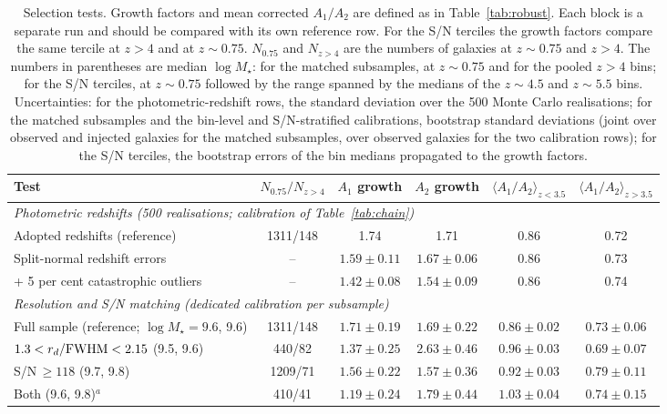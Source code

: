 \documentclass[fleqn,usenatbib]{mnras}
\newcommand{\Mstar}{M_\star}
\begin{document}
\begin{table}
\centering
\caption{Selection tests. Growth factors and mean corrected $A_1/A_2$ are
defined as in Table~\ref{tab:robust}. Each block is a separate run and should be
compared with its own reference row. For the S/N terciles the growth factors
compare the same tercile at $z>4$ and at $z\sim0.75$. $N_{0.75}$ and $N_{z>4}$ are
the numbers of galaxies at $z\sim0.75$ and $z>4$. The numbers in parentheses are
median $\log\Mstar$: for the matched subsamples, at $z\sim0.75$ and for the pooled
$z>4$ bins; for the S/N terciles, at $z\sim0.75$ followed by the range spanned by
the medians of the $z\sim4.5$ and $z\sim5.5$ bins. Uncertainties: for the
photometric-redshift rows, the standard deviation over the 500 Monte Carlo
realisations; for the matched subsamples and the bin-level and S/N-stratified
calibrations, bootstrap standard deviations (joint over observed and injected
galaxies for the matched subsamples, over observed galaxies for the two
calibration rows); for the S/N terciles, the bootstrap errors of the bin medians
propagated to the growth factors.}
\label{tab:selection}
\small
\begin{tabular}{lccccc}
\hline
{Test} & {$N_{0.75}/N_{z>4}$} & {$A_1$ growth} & {$A_2$ growth} &
{$\langle A_1/A_2\rangle_{z<3.5}$} & {$\langle A_1/A_2\rangle_{z>3.5}$}\\
\hline
\multicolumn{6}{l}{\textit{Photometric redshifts (500 realisations; calibration of Table~\ref{tab:chain})}}\\
Adopted redshifts (reference) & 1311/148 & 1.74 & 1.71 & 0.86 & 0.72\\
Split-normal redshift errors & -- & $1.59\pm0.11$ & $1.67\pm0.06$ & 0.86 & 0.73\\
\quad + 5 per cent catastrophic outliers & -- & $1.42\pm0.08$ & $1.54\pm0.09$ & 0.86 & 0.74\\
\multicolumn{6}{l}{\textit{Resolution and S/N matching (dedicated calibration per subsample)}}\\
Full sample (reference; $\log\Mstar=9.6$, 9.6) & 1311/148 & $1.71\pm0.19$ & $1.69\pm0.22$ & $0.86\pm0.02$ & $0.73\pm0.06$\\
$1.3<r_d/{\rm FWHM}<2.15$ (9.5, 9.6) & 440/82 & $1.37\pm0.25$ & $2.63\pm0.46$ & $0.96\pm0.03$ & $0.69\pm0.07$\\
S/N$\,\geq118$ (9.7, 9.8) & 1209/71 & $1.56\pm0.22$ & $1.57\pm0.36$ & $0.92\pm0.03$ & $0.79\pm0.11$\\
Both (9.6, 9.8)$^a$ & 410/41 & $1.19\pm0.24$ & $1.79\pm0.44$ & $1.03\pm0.04$ & $0.74\pm0.15$\\

\end{tabular}
\end{table}
\end{document}
